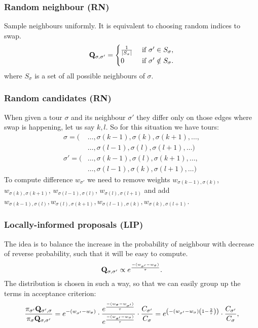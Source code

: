 \begin{frame}
	\frametitle{Random neighbour (RN)}
	Sample neighbours uniformly. It is equivalent to choosing random indices to swap.
	\begin{equation*} \label{eq:PQ}
		\mathbf{Q}_{\sigma,\sigma'} = 
		\begin{cases}
		\frac{1}{|S_\sigma|} & \text{ if } \sigma' \in S_\sigma, \\ 
		0 & \text{ if } \sigma' \notin S_\sigma.
		\end{cases}
	\end{equation*} 
	where $S_\sigma$ is a set of all possible neighbours of $\sigma$.
\end{frame}

\begin{frame}
	\frametitle{Random candidates (RN)}
	When given a tour $\sigma$ and its neighbour $\sigma'$ they differ only on those edges where swap is happening, let us say $k,l$. So for this situation we have tours:
	\begin{align*}
		\sigma = (&\ldots, \sigma(k-1), \sigma(k), \sigma(k+1), \ldots, \\
		&\ldots, \sigma(l-1), \sigma(l), \sigma(l+1), \ldots) \\
		\sigma' = (&\ldots, \sigma(k-1), \sigma(l), \sigma(k+1), \ldots, \\
		&\ldots, \sigma(l-1), \sigma(k), \sigma(l+1), \ldots)
	\end{align*}
	To compute difference $w_{\sigma'}$ we need to remove weights $w_{\sigma(k-1), \sigma(k)}$, $w_{\sigma(k), \sigma(k+1)}$, $w_{\sigma(l-1), \sigma(l)}$, $w_{\sigma(l), \sigma(l+1)}$ and add $w_{\sigma(k-1), \sigma(l)}, w_{\sigma(l), \sigma(k+1)}, w_{\sigma(l-1), \sigma(k)}, w_{\sigma(k), \sigma(l+1)}$.
\end{frame}

\begin{frame}
	\frametitle{Locally-informed proposals (LIP)}
	The idea is to balance the increase in the probability of neighbour with decrease of reverse probability, such that it will be easy to compute.
	\begin{equation*}
		\mathbf{Q}_{\sigma,\sigma'} \propto e^\frac{-(w_{\sigma'} - w_\sigma)}{\tau}.
	\end{equation*}
	The distribution is chosen in such a way, so that we can easily group up the terms in acceptance criterion:
	\begin{equation*}
		\frac{\pi_{\sigma'} \mathbf{Q}_{\sigma',\sigma}}{\pi_\sigma \mathbf{Q}_{\sigma,\sigma'}} = e^{-(w_{\sigma'}-w_\sigma)} \cdot \frac{e^\frac{-(w_{\sigma} - w_{\sigma'})}{\tau}}{e^\frac{-(w_{\sigma'} - w_\sigma)}{\tau}} \cdot \frac{C_{\sigma'}}{C_\sigma} = e^{\left( -(w_{\sigma'}-w_\sigma) \left(1 - \frac{2}{\tau}\right) \right)} \cdot \frac{C_{\sigma'}}{C_\sigma},
	\end{equation*}
\end{frame}



